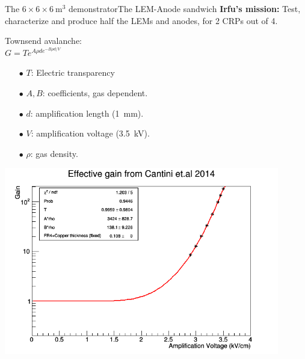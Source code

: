 \documentclass[10pt]{beamer}
\begin{document}
    \begin{frame}{The \texorpdfstring{$6 \times 6 \times \SI{6}{\meter\cubed}$}{666}
    		demonstrator}{The LEM-Anode sandwich}
    	\centering \textbf{Irfu's mission: }Test, characterize and produce  half the LEMs and anodes, for 2 CRPs out of 4.\\\vfill
   		\begin{minipage}{0.48\textwidth}
   			Townsend avalanche:\\
   			\centering  $G = Te^{A\rho d e^{-B\rho d/V}}$\\
   			\begin{scriptsize}
    			\begin{itemize}
    				\item[$\bullet$] $T$: Electric transparency
    				\item[$\bullet$] $A,B$: coefficients, gas dependent.
    				\item[$\bullet$] $d$: amplification length (\SI{1}{\milli\meter}).
    				\item[$\bullet$] $V$: amplification voltage (\SI{3.5}{\kilo\volt}).
    				\item[$\bullet$] $\rho$: gas density.
    			\end{itemize}
    		\end{scriptsize} 
   			\vfill
			\includegraphics[width=0.9\textwidth]{figures/666/3L_gain.png}
   		\end{minipage}\hfill
   		\begin{minipage}{0.48\textwidth}

\end{minipage}
\end{frame}
\end{document}
